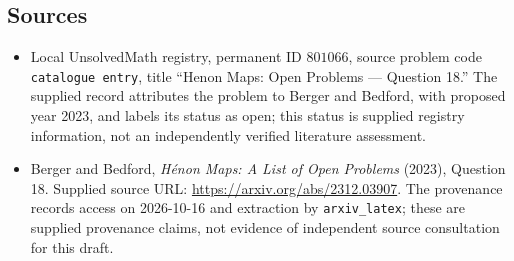 \documentclass[11pt]{article}
\begin{document}
\subsection{Sources}
\begin{itemize}
\item Local UnsolvedMath registry, permanent ID \(801066\), source problem code \texttt{catalogue entry}, title ``Henon Maps: Open Problems --- Question 18.'' The supplied record attributes the problem to Berger and Bedford, with proposed year 2023, and labels its status as open; this status is supplied registry information, not an independently verified literature assessment.
\item Berger and Bedford, \emph{H\'enon Maps: A List of Open Problems} (2023), Question 18. Supplied source URL: \url{https://arxiv.org/abs/2312.03907}. The provenance records access on 2026-10-16 and extraction by \texttt{arxiv\_latex}; these are supplied provenance claims, not evidence of independent source consultation for this draft.
\end{itemize}
\end{document}
